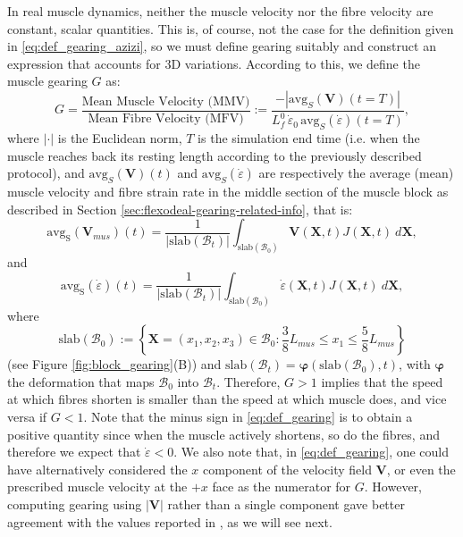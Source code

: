 \documentclass{sfuthesis}
\numberwithin{equation}{section}
\numberwithin{figure}{chapter}
\numberwithin{table}{chapter}
\theoremstyle{definition}
\def\*#1{{\mathbf{#1}}} %
\newcommand{\depsilon}{\dot{\varepsilon}}
\newcommand{\B}{\mathcal{B}}
\begin{document}
In real muscle dynamics, neither the muscle velocity nor the fibre velocity are constant, scalar quantities. This is, of course, not the case for the definition given in \eqref{eq:def_gearing_azizi}, so we must define gearing suitably and construct an expression that accounts for 3D variations. According to this, we define the muscle gearing $G$ as:
\begin{equation} \label{eq:def_gearing}
    G = \dfrac{\text{Mean Muscle Velocity (MMV)}}{\text{Mean Fibre Velocity (MFV)}}:= \dfrac{-\left|\mathrm{avg}_S(\*V)(t=T) \right|}{L_f^0 \, \depsilon_0 \, \mathrm{avg}_S(\depsilon)(t=T)},
\end{equation}
where $|\cdot|$ is the Euclidean norm, $T$ is the simulation end time (i.e. when the muscle reaches back its resting length according to the previously described protocol), and $\mathrm{avg}_S(\*V)(t)$ and $\mathrm{avg}_S(\depsilon)$ are respectively the average (mean) muscle velocity and fibre strain rate in the middle section of the muscle block as described in Section \ref{sec:flexodeal-gearing-related-info}, that is:
\begin{equation}
    \mathrm{avg}_\mathrm{S}(\*V_{mus})(t) = \dfrac{1}{|\mathrm{slab}(\B_t)|} \int_{\mathrm{slab}(\B_0)} \*V(\*X,t) J(\*X,t) \ d\*X,
\end{equation}
and
\begin{equation}
    \mathrm{avg}_\mathrm{S}(\dot{\varepsilon})(t) = \dfrac{1}{|\mathrm{slab}(\B_t)|} \int_{\mathrm{slab}(\B_0)} \dot{\varepsilon}(\*X,t) J(\*X,t) \ d\*X,
\end{equation}
where
\begin{equation}
    \mathrm{slab}(\B_0) := \left\{ \*X = (x_1,x_2,x_3) \in \B_0 : \dfrac{3}{8}L_{mus} \leq x_1 \leq \dfrac{5}{8} L_{mus} \right\}
\end{equation}
(see Figure \ref{fig:block_gearing}(B)) and $\mathrm{slab}(\B_t) = \bm{\varphi} \left(\mathrm{slab}(\B_0), t \right)$, with $\bm{\varphi}$  the deformation that maps $\B_0$ into $\B_t$. Therefore, $G>1$ implies that the speed at which fibres shorten is smaller than the speed at which muscle does, and vice versa if $G < 1$. Note that the minus sign in \eqref{eq:def_gearing} is to obtain a positive quantity since when the muscle actively shortens, so do the fibres, and therefore we expect that $\depsilon < 0$. We also note that, in \eqref{eq:def_gearing}, one could have alternatively considered the $x$ component of the velocity field $\*V$, or even the prescribed muscle velocity at the $+x$ face as the numerator for $G$. However, computing gearing using $|\*V|$ rather than a single component gave better agreement with the values reported in \cite{Holt2016}, as we will see next. 
\end{document}
